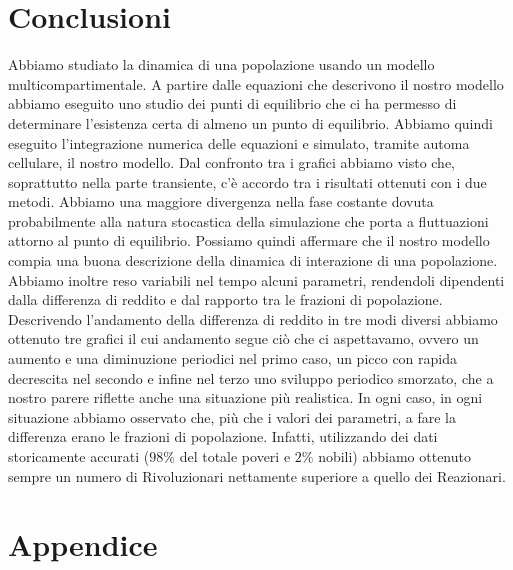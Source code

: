 \section{Conclusioni}
Abbiamo studiato la dinamica di una popolazione usando un modello multicompartimentale. A partire dalle equazioni che descrivono il nostro modello abbiamo eseguito uno studio dei punti di equilibrio che ci ha permesso di determinare l'esistenza certa di almeno un punto di equilibrio. Abbiamo quindi eseguito l'integrazione numerica delle equazioni e simulato, tramite automa cellulare, il nostro modello. Dal confronto tra i grafici abbiamo visto che, soprattutto nella parte transiente, c'è accordo tra i risultati ottenuti con i due metodi. Abbiamo una maggiore divergenza nella fase costante dovuta probabilmente alla natura stocastica della simulazione che porta a fluttuazioni attorno al punto di equilibrio. Possiamo quindi affermare che il nostro modello compia una buona descrizione della dinamica di interazione di una popolazione. Abbiamo inoltre  reso variabili nel tempo alcuni parametri, rendendoli dipendenti dalla differenza di reddito e dal rapporto tra le frazioni di popolazione. Descrivendo l'andamento della differenza di reddito in tre modi diversi abbiamo ottenuto tre grafici il cui andamento segue ciò che ci aspettavamo, ovvero un aumento e una diminuzione periodici nel primo caso, un  picco con rapida decrescita nel secondo e infine nel terzo uno sviluppo periodico smorzato, che a nostro parere riflette anche una situazione più realistica. In ogni caso, in ogni situazione abbiamo osservato che, più che i valori dei parametri, a fare la differenza erano le frazioni di popolazione. Infatti, utilizzando dei dati storicamente accurati ($ 98\% $ del totale poveri e $ 2\% $ nobili) abbiamo ottenuto sempre un numero di Rivoluzionari nettamente superiore a quello dei Reazionari. %
\newpage
\appendix
\section*{Appendice}
